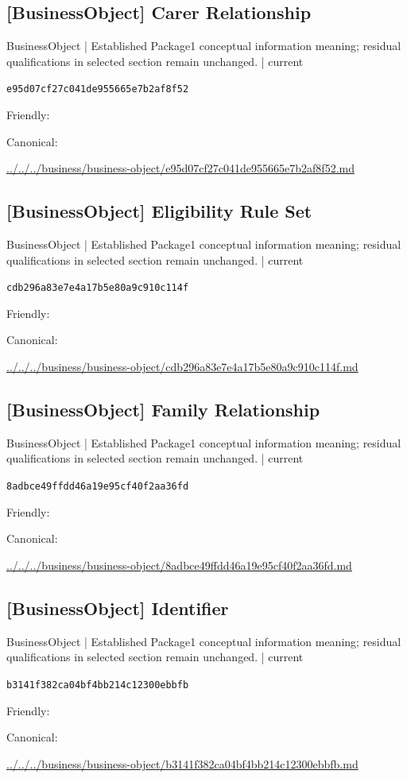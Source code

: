 \documentclass[10pt,a4paper]{article}
\begin{document}
\subsection*{[BusinessObject] Carer Relationship}
{\small BusinessObject | Established Package1 conceptual information meaning; residual qualifications in selected section remain unchanged. | current}\par
\texttt{e95d07cf27c041de955665e7b2af8f52}\par
Friendly: \par
Canonical: \par
{\footnotesize\url{../../../business/business-object/e95d07cf27c041de955665e7b2af8f52.md}}\par
\subsection*{[BusinessObject] Eligibility Rule Set}
{\small BusinessObject | Established Package1 conceptual information meaning; residual qualifications in selected section remain unchanged. | current}\par
\texttt{cdb296a83e7e4a17b5e80a9c910c114f}\par
Friendly: \par
Canonical: \par
{\footnotesize\url{../../../business/business-object/cdb296a83e7e4a17b5e80a9c910c114f.md}}\par
\subsection*{[BusinessObject] Family Relationship}
{\small BusinessObject | Established Package1 conceptual information meaning; residual qualifications in selected section remain unchanged. | current}\par
\texttt{8adbce49ffdd46a19e95cf40f2aa36fd}\par
Friendly: \par
Canonical: \par
{\footnotesize\url{../../../business/business-object/8adbce49ffdd46a19e95cf40f2aa36fd.md}}\par
\subsection*{[BusinessObject] Identifier}
{\small BusinessObject | Established Package1 conceptual information meaning; residual qualifications in selected section remain unchanged. | current}\par
\texttt{b3141f382ca04bf4bb214c12300ebbfb}\par
Friendly: \par
Canonical: \par
{\footnotesize\url{../../../business/business-object/b3141f382ca04bf4bb214c12300ebbfb.md}}\par
\end{document}
